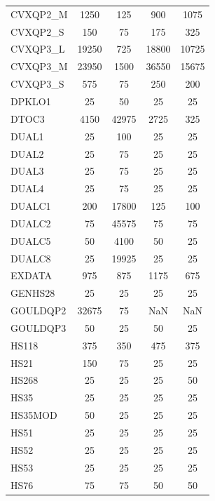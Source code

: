 \begin{longtable}{lcccc}
CVXQP2\_M &     1250 &   125 &      900 &     1075 \\
CVXQP2\_S &      150 &    75 &      175 &      325 \\
CVXQP3\_L &    19250 &   725 &    18800 &    10725 \\
CVXQP3\_M &    23950 &  1500 &    36550 &    15675 \\
CVXQP3\_S &      575 &    75 &      250 &      200 \\
DPKLO1   &       25 &    50 &       25 &       25 \\
DTOC3    &     4150 & 42975 &     2725 &      325 \\
DUAL1    &       25 &   100 &       25 &       25 \\
DUAL2    &       25 &    75 &       25 &       25 \\
DUAL3    &       25 &    75 &       25 &       25 \\
DUAL4    &       25 &    75 &       25 &       25 \\
DUALC1   &      200 & 17800 &      125 &      100 \\
DUALC2   &       75 & 45575 &       75 &       75 \\
DUALC5   &       50 &  4100 &       50 &       25 \\
DUALC8   &       25 & 19925 &       25 &       25 \\
EXDATA   &      975 &   875 &     1175 &      675 \\
GENHS28  &       25 &    25 &       25 &       25 \\
GOULDQP2 &    32675 &    75 &      NaN &      NaN \\
GOULDQP3 &       50 &    25 &       50 &       25 \\
HS118    &      375 &   350 &      475 &      375 \\
HS21     &      150 &    75 &       25 &       25 \\
HS268    &       25 &    25 &       25 &       50 \\
HS35     &       25 &    25 &       25 &       25 \\
HS35MOD  &       50 &    25 &       25 &       25 \\
HS51     &       25 &    25 &       25 &       25 \\
HS52     &       25 &    25 &       25 &       25 \\
HS53     &       25 &    25 &       25 &       25 \\
HS76     &       75 &    75 &       50 &       50 \\

\end{longtable}
